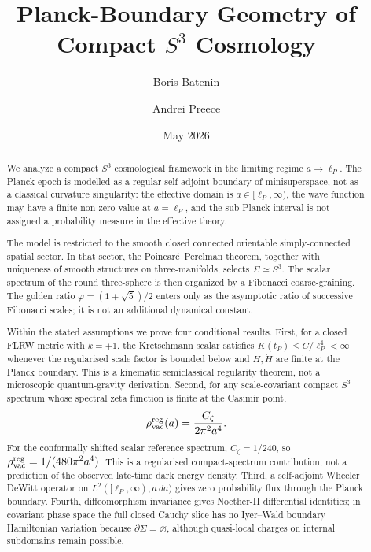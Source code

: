 \documentclass[reprint,aps,prd,letterpaper,superscriptaddress,nofootinbib,longbibliography,floatfix]{revtex4-2}
\theoremstyle{remark}
\newcommand{\Czeta}{C_\zeta}
\begin{document}

\title{Planck-Boundary Geometry of Compact \texorpdfstring{$S^3$}{S3} Cosmology}

\author{Boris Batenin}

\author{Andrei Preece}

\date{May 2026}

\begin{abstract}
We analyze a compact \(S^3\) cosmological framework in the limiting regime
\(a\to\ell_P\).  The Planck epoch is modelled as a regular self-adjoint
boundary of minisuperspace, not as a classical curvature singularity: the
effective domain is \(a\in[\ell_P,\infty)\), the wave function may have a finite
non-zero value at \(a=\ell_P\), and the sub-Planck interval is not assigned a
probability measure in the effective theory.

The model is restricted to the smooth closed connected orientable
simply-connected spatial sector.  In that sector, the Poincar\'e--Perelman
theorem, together with uniqueness of smooth structures on three-manifolds,
selects \(\Sigma\simeq S^3\).  The scalar spectrum of the round three-sphere is
then organized by a Fibonacci coarse-graining.  The golden ratio
\(\varphi=(1+\sqrt5)/2\) enters only as the asymptotic ratio of successive
Fibonacci scales; it is not an additional dynamical constant.

Within the stated assumptions we prove four conditional results.  First, for a
closed FLRW metric with \(k=+1\), the Kretschmann scalar satisfies
\(K(t_P)\le C/\ell_P^4<\infty\) whenever the regularised scale factor is bounded
below and \(H,\dot H\) are finite at the Planck boundary.  This is a kinematic
semiclassical regularity theorem, not a microscopic quantum-gravity derivation.
Second, for any scale-covariant compact \(S^3\) spectrum whose spectral zeta
function is finite at the Casimir point,
\[
  \rho_{\rm vac}^{\rm reg}(a)=\frac{\Czeta}{2\pi^2a^4}.
\]
For the conformally shifted scalar reference spectrum,
\(\Czeta=1/240\), so
\(\rho_{\rm vac}^{\rm reg}=1/(480\pi^2a^4)\).  This is a regularised
compact-spectrum contribution, not a prediction of the observed late-time dark
energy density.  Third, a self-adjoint Wheeler--DeWitt operator on
\(L^2([\ell_P,\infty),a\,da)\) gives zero probability flux through the Planck
boundary.  Fourth, diffeomorphism invariance gives Noether-II differential
identities; in covariant phase space the full closed Cauchy slice has no
Iyer--Wald boundary Hamiltonian variation because \(\partial\Sigma=\varnothing\),
although quasi-local charges on internal subdomains remain possible.
\end{abstract}
\end{document}
